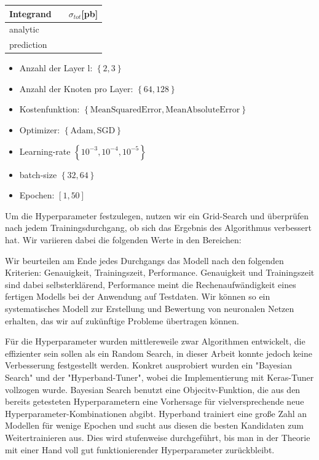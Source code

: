 
%

\begin{table}
\centering
\begin{tabular}{lll}
	Integrand & \multicolumn{2}{l}{$\quad \sigma_{tot}$[pb]} \\
	\hline
	analytic & & \\
	prediction & & \\
\end{tabular}
\end{table}

\begin{itemize}
\setlength\itemsep{0.1cm}
\setlength{\parskip}{0.1cm}
\item Anzahl der Layer l: $\left\lbrace2, 3\right\rbrace$  
\item Anzahl der Knoten pro Layer: $\left\lbrace64, 128 \right\rbrace $
\item Kostenfunktion: $\left\lbrace \text{MeanSquaredError}, \text{MeanAbsoluteError} \right\rbrace$
\item Optimizer: $\left\lbrace \text{Adam}, \text{SGD} \right\rbrace$
\item Learning-rate $\left\lbrace 10^{-3}, 10^{-4}, 10^{-5} \right\rbrace$
\item batch-size $\left\lbrace 32, 64 \right\rbrace$
\item Epochen: $\left[1,50\right]$
\end{itemize}

Um die Hyperparameter festzulegen, nutzen wir ein Grid-Search und überprüfen nach jedem Trainingsdurchgang, ob sich das Ergebnis des Algorithmus verbessert hat. Wir variieren dabei die folgenden Werte in den Bereichen:

Wir beurteilen am Ende jedes Durchgangs das Modell nach den folgenden Kriterien: Genauigkeit, Trainingszeit, Performance. Genauigkeit und Trainingszeit sind dabei selbsterklärend, Performance meint die Rechenaufwändigkeit eines fertigen Modells bei der Anwendung auf Testdaten. Wir können so ein systematisches Modell zur Erstellung und Bewertung von neuronalen Netzen erhalten, das wir auf zukünftige Probleme übertragen können.

Für die Hyperparameter wurden mittlereweile zwar Algorithmen entwickelt, die effizienter sein sollen als ein Random Search, in dieser Arbeit konnte jedoch keine Verbesserung festgestellt werden. Konkret ausprobiert wurden ein "Bayesian Search" und der "Hyperband-Tuner", wobei die Implementierung mit Keras-Tuner vollzogen wurde. Bayesian Search benutzt eine Objecitv-Funktion, die aus den bereits getesteten Hyperparametern eine Vorhersage für vielversprechende neue Hyperparameter-Kombinationen abgibt. Hyperband trainiert eine große Zahl an Modellen für wenige Epochen und sucht aus diesen die besten Kandidaten zum Weitertrainieren aus. Dies wird stufenweise durchgeführt, bis man in der Theorie mit einer Hand voll gut funktionierender Hyperparameter zurückbleibt.

